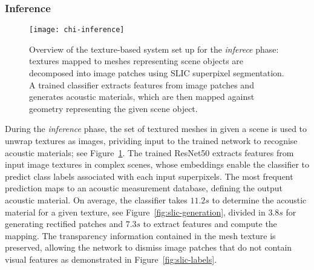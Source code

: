 \subsubsection{Inference}
\begin{figure}[htbp]
    \centering
    \texttt{[image: chi-inference]}
    \caption[Texture-based material recognition system --- inference phase]{Overview of the texture-based system set up for the \emph{inferece} phase: textures mapped to meshes representing scene objects are decomposed into image patches using SLIC superpixel segmentation. A trained classifier extracts features from image patches and generates acoustic materials, which are then mapped against geometry representing the given scene object.}
    \label{fig:texture-tagging-inference}
\end{figure}
During the \emph{inference} phase, the set of textured meshes in given a scene is used to unwrap textures as images, prividing input to the trained network to recognise acoustic materials; see Figure~\ref{fig:texture-tagging-inference}. The trained ResNet50 extracts features from input image textures in complex scenes, whose embeddings enable the classifier to predict class labels associated with each input superpixels. The most frequent prediction maps to an acoustic measurement database, defining the output acoustic material. On average, the classifier takes $11.2s$ to determine the acoustic material for a given texture, see Figure~\ref{fig:slic-generation}, divided in $3.8s$ for generating rectified patches and $7.3s$ to extract features and compute the mapping. The transparency information contained in the mesh texture is preserved, allowing the network to dismiss image patches that do not contain visual features as demonstrated in Figure~\ref{fig:slic-labels}.

